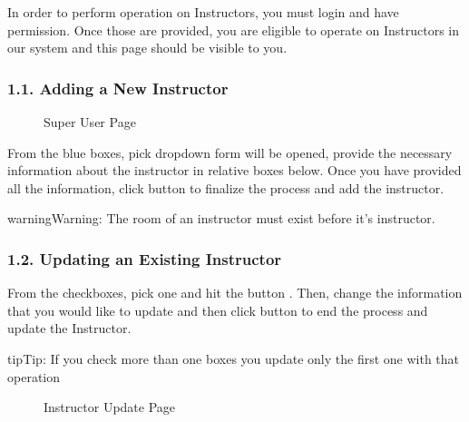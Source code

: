 \documentclass[letterpaper,10pt,english]{sphinxmanual}
\begin{document}
In order to perform operation on Instructors, you must login and have permission.
Once those are provided, you are eligible to operate on Instructors in our system and this page should be
visible to you.


\subsubsection{1.1. Adding a New Instructor}
\label{\detokenize{user/berkay:adding-a-new-instructor}}
\begin{figure}[htbp]
\centering
\capstart

\noindent{}
\caption{Super User Page}\label{\detokenize{user/berkay:id1}}\end{figure}

From the blue boxes, pick  dropdown form will be opened, provide the necessary information
about the instructor in relative boxes below. Once you have provided all the information, click 
button to finalize the process and add the instructor.

\begin{sphinxadmonition}{warning}{Warning:}
The room of an instructor must exist before it’s instructor.
\end{sphinxadmonition}


\subsubsection{1.2. Updating an Existing Instructor}
\label{\detokenize{user/berkay:updating-an-existing-instructor}}
From the checkboxes, pick one and hit the button . Then, change the information that
you would like to update and then click  button to end the process and update the Instructor.

\begin{sphinxadmonition}{tip}{Tip:}
If you check more than one boxes you update only the first one with that operation
\end{sphinxadmonition}

\begin{figure}[htbp]
\centering
\capstart

\noindent{}
\caption{Instructor Update Page}\label{\detokenize{user/berkay:id2}}\end{figure}
\end{document}
